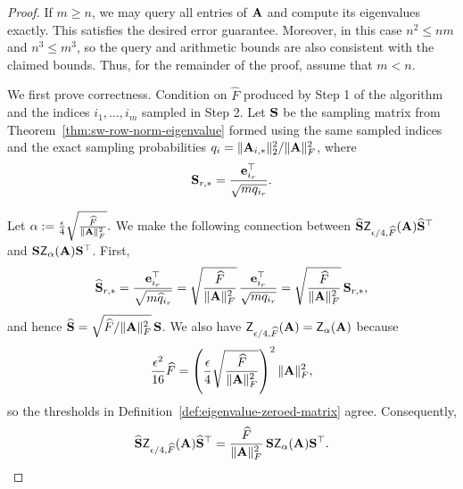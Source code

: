 \begin{proof}
If \(m\geq n\), we may query all entries of \(\mathbf{A}\) and compute its
eigenvalues exactly. This satisfies the desired error guarantee. Moreover,
in this case \(n^2\leq nm\) and \(n^3\leq m^3\), so the query and
arithmetic bounds are also consistent with the claimed bounds. Thus, for
the remainder of the proof, assume that \(m<n\).

We first prove correctness. Condition on \(\widehat F\) produced by Step 1
of the algorithm and the indices \(i_1,\ldots,i_m\) sampled in Step 2. Let
\(\mathbf{S}\) be the sampling matrix from Theorem~\ref{thm:sw-row-norm-eigenvalue}
formed using the same sampled indices and the exact sampling probabilities
\(q_i=\|\mathbf{A}_{i,*}\|_2^2/\|\mathbf{A}\|_F^2\), where
\[\mathbf{S}_{r, *} = \frac{\mathbf{e}_{i_r}^\top}{\sqrt{mq_{i_r}}}.\]

Let
\(
    \alpha
    :=
    \frac{\epsilon}{4}\sqrt{\frac{\widehat F}{\|\mathbf{A}\|_F^2}}.
\)
We make the following connection between \(\widehat {\mathbf{S}}\mathsf Z_{\epsilon/4,\widehat F}(\mathbf{A})\widehat {\mathbf{S}}^\top\) and $\mathbf{S}\mathsf Z_{\alpha}(\mathbf{A}) \mathbf{S}^\top$.
First, 
\[
    \widehat {\mathbf{S}}_{r,*}
    =
    \frac{\mathbf{e}_{i_r}^{\top}}{\sqrt{m\widehat q_{i_r}}}
    =
    \sqrt{\frac{\widehat F}{\|\mathbf{A}\|_F^2}}\,
    \frac{\mathbf{e}_{i_r}^{\top}}{\sqrt{m q_{i_r}}}
    =
    \sqrt{\frac{\widehat F}{\|\mathbf{A}\|_F^2}}\,\mathbf{S}_{r,*},
\]
and hence \(\widehat {\mathbf{S}}=\sqrt{\widehat F/\|\mathbf{A}\|_F^2}\,\mathbf{S}\). We also have
\(\mathsf Z_{\epsilon/4, \widehat F}(\mathbf{A})=\mathsf Z_{\alpha}(\mathbf{A})\) because
\[
    \frac{\epsilon^2}{16}\widehat F
    =
    \left(
        \frac{\epsilon}{4}
        \sqrt{\frac{\widehat F}{\|\mathbf{A}\|_F^2}}
    \right)^2
    \|\mathbf{A}\|_F^2,
\]
so the thresholds in Definition~\ref{def:eigenvalue-zeroed-matrix} agree.
Consequently,
\[
    \widehat {\mathbf{S}}\mathsf Z_{\epsilon/4,\widehat F}(\mathbf{A})\widehat {\mathbf{S}}^\top
    =
    \frac{\widehat F}{\|\mathbf{A}\|_F^2}\,
    \mathbf{S}\mathsf Z_{\alpha}(\mathbf{A})\mathbf{S}^\top.
\]


\end{proof}
